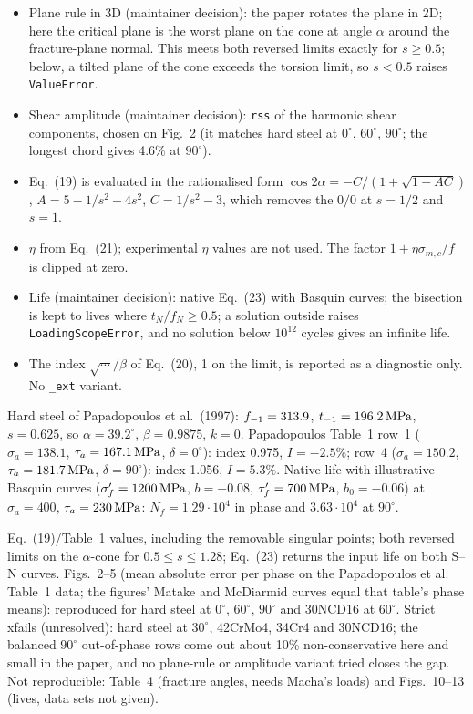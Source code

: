 \begin{itemize}
\item Plane rule in 3D (maintainer decision): the paper rotates the plane in 2D; here the critical
  plane is the worst plane on the cone at angle $\alpha$ around the fracture-plane normal. This meets
  both reversed limits exactly for $s\ge0.5$; below, a tilted plane of the cone exceeds the torsion
  limit, so $s<0.5$ raises \texttt{ValueError}.
\item Shear amplitude (maintainer decision): \texttt{rss} of the harmonic shear components, chosen on
  Fig.~2 (it matches hard steel at $0^\circ$, $60^\circ$, $90^\circ$; the longest chord gives 4.6\% at
  $90^\circ$).
\item Eq.~(19) is evaluated in the rationalised form $\cos2\alpha=-C/(1+\sqrt{1-AC})$, $A=5-1/s^2-4s^2$,
  $C=1/s^2-3$, which removes the $0/0$ at $s=1/2$ and $s=1$.
\item $\eta$ from Eq.~(21); experimental $\eta$ values are not used. The factor
  $1+\eta\sigma_{m,c}/f$ is clipped at zero.
\item Life (maintainer decision): native Eq.~(23) with Basquin curves; the bisection is kept to lives
  where $t_N/f_N\ge0.5$; a solution outside raises \texttt{LoadingScopeError}, and no solution below
  $10^{12}$ cycles gives an infinite life.
\item The index $\sqrt{\cdots}/\beta$ of Eq.~(20), 1 on the limit, is reported as a diagnostic only. No
  \texttt{\_ext} variant.
\end{itemize}

 Hard steel of Papadopoulos et al.\ (1997): $f_{-1}=313.9$, $t_{-1}=196.2\,\mathrm{MPa}$,
$s=0.625$, so $\alpha=39.2^\circ$, $\beta=0.9875$, $k=0$. Papadopoulos Table~1 row~1
($\sigma_a=138.1$, $\tau_a=167.1\,\mathrm{MPa}$, $\delta=0^\circ$): index 0.975, $I=-2.5\%$; row~4
($\sigma_a=150.2$, $\tau_a=181.7\,\mathrm{MPa}$, $\delta=90^\circ$): index 1.056, $I=5.3\%$. Native life with
illustrative Basquin curves ($\sigma_f'=1200\,\mathrm{MPa}$, $b=-0.08$, $\tau_f'=700\,\mathrm{MPa}$, $b_0=-0.06$) at
$\sigma_a=400$, $\tau_a=230\,\mathrm{MPa}$: $N_f=1.29\cdot10^4$ in phase and $3.63\cdot10^4$ at $90^\circ$.

 Eq.~(19)/Table~1 values, including the removable singular points; both reversed
limits on the $\alpha$-cone for $0.5\le s\le1.28$; Eq.~(23) returns the input life on both S--N curves.
Figs.~2--5 (mean absolute error per phase on the Papadopoulos et al.\ \cite{papadopoulos1997} Table~1
data; the figures' Matake and McDiarmid curves equal that table's phase means): reproduced for hard
steel at $0^\circ$, $60^\circ$, $90^\circ$ and 30NCD16 at $60^\circ$. Strict xfails (unresolved): hard
steel at $30^\circ$, 42CrMo4, 34Cr4 and 30NCD16; the balanced $90^\circ$ out-of-phase rows come out
about 10\% non-conservative here and small in the paper, and no plane-rule or amplitude variant tried
closes the gap. Not reproducible: Table~4 (fracture angles, needs Macha's loads) and Figs.~10--13
(lives, data sets not given).
